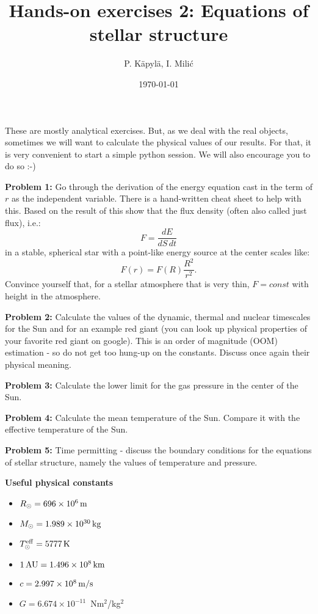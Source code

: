 \documentclass[12pt]{article}
\title{Hands-on exercises 2: Equations of stellar structure}
\author{P. K\"{a}pyl\"{a}, I. Mili\'{c}}
\date{\today}
\begin{document}
\maketitle


These are mostly analytical exercises. But, as we deal with the real objects, sometimes we will want to calculate the physical values of our results. For that, it is very convenient to start a simple python session. We will also encourage you to do so :-) 

{\bf Problem 1:} Go through the derivation of the energy equation cast in the term of $r$ as the independent variable. There is a hand-written cheat sheet to help with this. Based on the result of this show that the flux density (often also called just flux), i.e.:
\begin{equation}
F = \frac{dE}{dS\,dt}
\end{equation}
in a stable, spherical star with a point-like energy source at the center scales like: 
\begin{equation}
F(r) = F(R) \frac{R^2}{r^2}.
\end{equation}
Convince yourself that, for a stellar atmosphere that is very thin, $F=const$ with height in the atmosphere. 

{\bf Problem 2:} Calculate the values of the dynamic, thermal and nuclear timescales for the Sun and for an example red giant (you can look up physical properties of your favorite red giant on google). This is an order of magnitude (OOM) estimation - so do not get too hung-up on the constants. Discuss once again their physical meaning. 

{\bf Problem 3:} Calculate the lower limit for the gas pressure in the center of the Sun. 

{\bf Problem 4:} Calculate the mean temperature of the Sun. Compare it with the effective temperature of the Sun. 

{\bf Problem 5:} Time permitting - discuss the boundary conditions for the equations of stellar structure, namely the values of temperature and pressure. 

{\bf Useful physical constants}
\begin{itemize}
  \item $R_{\odot} = 696 \times 10^6\,{\rm m}$
  \item $M_{\odot} = 1.989 \times 10^{30}\,{\rm kg}$
  \item $T^{\rm eff}_{\odot} = 5777\,{\rm K}$
  \item $1\,{\rm AU} = 1.496 \times 10^8\,{\rm km}$
  \item $c = 2.997 \times 10^8\,{\rm m/s}$
  \item $G = 6.674 \times 10^{-11}$~Nm$^2$/kg$^2$
\end{itemize}
\end{document}
